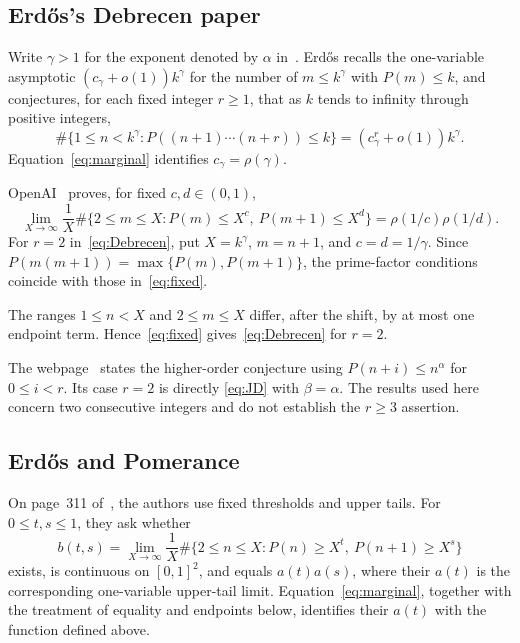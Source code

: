 \documentclass[11pt,a4paper]{amsart}
\begin{document}
\subsection{Erd\H{o}s's Debrecen paper}\label{subsec:debrecen}
Write $\gamma>1$ for the exponent denoted by $\alpha$
in~\cite[pp.~272--273]{Erdos1976Debrecen}. Erd\H{o}s recalls the
one-variable asymptotic $(c_\gamma+o(1))k^\gamma$ for the number of
$m\le k^\gamma$ with $P(m)\le k$, and conjectures, for each fixed integer
$r\ge1$, that as $k$ tends to infinity through positive integers,
\begin{equation}\label{eq:Debrecen}
 \#\{1\le n<k^\gamma:P((n+1)\cdots(n+r))\le k\}
  =(c_\gamma^r+o(1))k^\gamma.
\end{equation}
Equation~\eqref{eq:marginal} identifies $c_\gamma=\rho(\gamma)$.

OpenAI~\cite[(11.7), p.~80]{OpenAI2026} proves, for fixed $c,d\in(0,1)$,
\begin{equation}\label{eq:fixed}
 \lim_{X\to\infty}\frac1X
 \#\{2\le m\le X:P(m)\le X^c,\ P(m+1)\le X^d\}
 =\rho(1/c)\rho(1/d).
\end{equation}
For $r=2$ in~\eqref{eq:Debrecen}, put $X=k^\gamma$, $m=n+1$, and
$c=d=1/\gamma$. Since $P(m(m+1))=\max\{P(m),P(m+1)\}$, the
prime-factor conditions coincide with those in~\eqref{eq:fixed}.

The ranges $1\le n<X$ and $2\le m\le X$ differ,
after the shift, by at most one endpoint term. Hence~\eqref{eq:fixed}
gives~\eqref{eq:Debrecen} for $r=2$.

The webpage~\cite{Bloom928} states the higher-order conjecture using
$P(n+i)\le n^\alpha$ for $0\le i<r$. Its case $r=2$ is directly
\eqref{eq:JD} with $\beta=\alpha$. The results used here concern two
consecutive integers and do not establish the $r\ge3$ assertion.

\subsection{Erd\H{o}s and Pomerance}
On page~311 of~\cite{ErdosPomerance1978}, the authors use fixed
thresholds and upper tails. For $0\le t,s\le1$, they ask whether
\begin{equation}\label{eq:upper}
 b(t,s)=\lim_{X\to\infty}\frac1X
 \#\{2\le n\le X:P(n)\ge X^t,\ P(n+1)\ge X^s\}
\end{equation}
exists, is continuous on $[0,1]^2$, and equals $a(t)a(s)$, where their
$a(t)$ is the corresponding one-variable upper-tail limit.
Equation~\eqref{eq:marginal}, together with the treatment of equality and
endpoints below, identifies their $a(t)$ with the function defined above.
\end{document}
